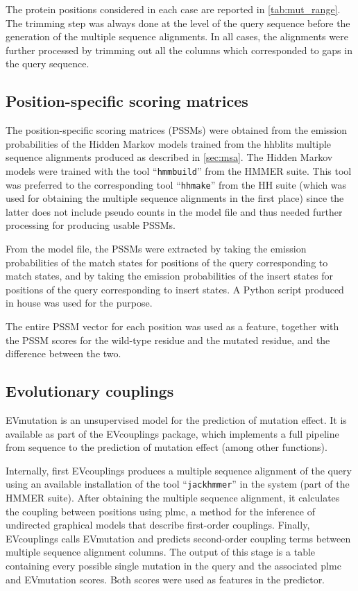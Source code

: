 The protein positions considered in each case are reported in \autoref{tab:mut_range}.
The trimming step was always done at the level of the query sequence before the generation of the multiple sequence alignments.
In all cases, the alignments were further processed by trimming out all the columns which corresponded to gaps in the query sequence.

\subsection{Position-specific scoring matrices}
The position-specific scoring matrices (PSSMs) were obtained from the emission probabilities of the Hidden Markov models trained from the hhblits multiple sequence alignments produced as described in \autoref{sec:msa}.
The Hidden Markov models were trained with the tool ``\texttt{hmmbuild}'' from the HMMER suite.
This tool was preferred to the corresponding tool ``\texttt{hhmake}'' from the HH suite (which was used for obtaining the multiple sequence alignments in the first place) since the latter does not include pseudo counts in the model file and thus needed further processing for producing usable PSSMs.

From the model file, the PSSMs were extracted by taking the emission probabilities of the match states for positions of the query corresponding to match states, and by taking the emission probabilities of the insert states for positions of the query corresponding to insert states.
A Python script produced in house was used for the purpose.

The entire PSSM vector for each position was used as a feature, together with the PSSM scores for the wild-type residue and the mutated residue, and the difference between the two.

\subsection{Evolutionary couplings}\label{sec:ev_mutation}
EVmutation is an unsupervised model for the prediction of mutation effect.
It is available as part of the EVcouplings package, which implements a full pipeline from sequence to the prediction of mutation effect (among other functions).

Internally, first EVcouplings produces a multiple sequence alignment of the query using an available installation of the tool ``\texttt{jackhmmer}'' in the system (part of the HMMER suite).
After obtaining the multiple sequence alignment, it calculates the coupling between positions using plmc, a method for the inference of undirected graphical models that describe first-order couplings.
Finally, EVcouplings calls EVmutation and predicts second-order coupling terms between multiple sequence alignment columns.
The output of this stage is a table containing every possible single mutation in the query and the associated plmc and EVmutation scores.
Both scores were used as features in the predictor.

